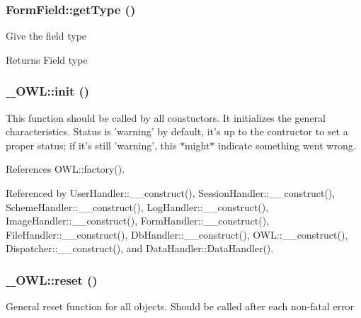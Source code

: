 \subsubsection[{getType}]{\setlength{\rightskip}{0pt plus 5cm}FormField::getType ()}\label{classFormField_a1f64b737bccb6b2827f8c5665b9920c7}
Give the field type \begin{DoxyReturn}{Returns}
Field type 
\end{DoxyReturn}
\subsubsection[{init}]{\setlength{\rightskip}{0pt plus 5cm}\_\-OWL::init ()}\label{class__OWL_ae0ef3ded56e8a6b34b6461e5a721cd3e}
This function should be called by all constuctors. It initializes the general characteristics. Status is 'warning' by default, it's up to the contructor to set a proper status; if it's still 'warning', this $\ast$might$\ast$ indicate something went wrong. 

References OWL::factory().



Referenced by UserHandler::\_\-\_\-construct(), SessionHandler::\_\-\_\-construct(), SchemeHandler::\_\-\_\-construct(), LogHandler::\_\-\_\-construct(), ImageHandler::\_\-\_\-construct(), FormHandler::\_\-\_\-construct(), FileHandler::\_\-\_\-construct(), DbHandler::\_\-\_\-construct(), OWL::\_\-\_\-construct(), Dispatcher::\_\-\_\-construct(), and DataHandler::DataHandler().

\subsubsection[{reset}]{\setlength{\rightskip}{0pt plus 5cm}\_\-OWL::reset ()}\label{class__OWL_a2f2a042bcf31965194c03033df0edc9b}
General reset function for all objects. Should be called after each non-\/fatal error 

